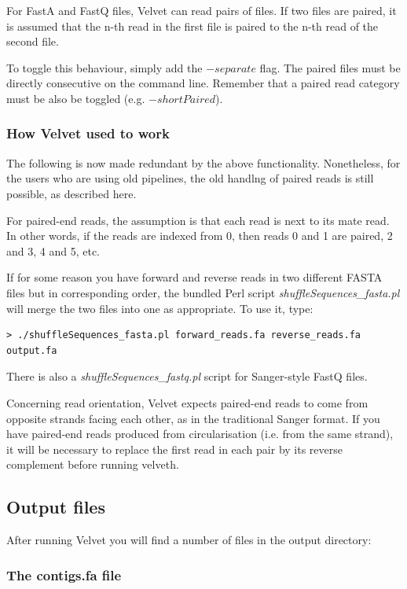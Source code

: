 \documentclass{article}
\begin{document}
For FastA and FastQ files, Velvet can read pairs of files. If two files are paired, it is assumed that the n-th read in the first file is paired to the n-th read of the second file.

To toggle this behaviour, simply add the $-separate$ flag. The paired files must be directly consecutive on the command line. Remember that a paired read category must be also be toggled (e.g. $-shortPaired$).

\subsubsection{How Velvet used to work}

The following is now made redundant by the above functionality. Nonetheless, for the users who are using old pipelines, the old handlng of paired reads is still possible, as described here.

For paired-end reads, the assumption is that each read is next to its mate
read. In other words, if the reads are indexed from 0, then reads 0 and 1 are
paired, 2 and 3, 4 and 5, etc.  

If for some reason you have forward and reverse reads in two different FASTA files
but in corresponding order, the bundled Perl script \emph{shuffleSequences\_fasta.pl} will
merge the two files into one as appropriate. To use it, type:
\begin{verbatim}
> ./shuffleSequences_fasta.pl forward_reads.fa reverse_reads.fa output.fa
\end{verbatim}

There is also a \emph{shuffleSequences\_fastq.pl} script for Sanger-style FastQ files.

Concerning read orientation, Velvet expects paired-end reads to come from opposite strands facing each other, as in the traditional Sanger format. If you have paired-end reads produced from circularisation (i.e. from the same strand), it will be necessary to replace the first read in each pair by its reverse complement before running velveth.

\subsection{Output files} 

\label{sec:output}

After running Velvet you will find a number of files in the output directory:

\subsubsection{The contigs.fa file}
\end{document}
